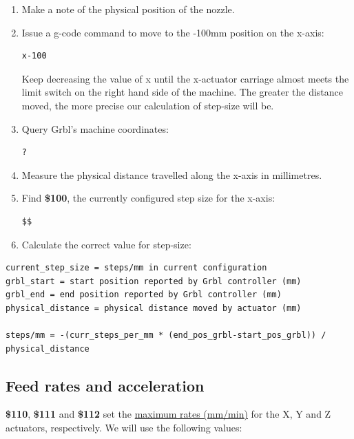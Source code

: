 \documentclass[]{book}
\theoremstyle{definition}
\theoremstyle{definition}
\theoremstyle{remark}
\begin{document}
\begin{enumerate}
\def\labelenumi{\arabic{enumi}.}
\setcounter{enumi}{2}
\item
  Make a note of the physical position of the nozzle.
\item
  Issue a g-code command to move to the -100mm position on the x-axis:

\begin{verbatim}
x-100
\end{verbatim}

  Keep decreasing the value of x until the x-actuator carriage almost
  meets the limit switch on the right hand side of the machine. The
  greater the distance moved, the more precise our calculation of
  step-size will be.
\item
  Query Grbl's machine coordinates:

\begin{verbatim}
?
\end{verbatim}
\item
  Measure the physical distance travelled along the x-axis in
  millimetres.
\item
  Find \textbf{\$100}, the currently configured step size for the
  x-axis:

\begin{verbatim}
$$
\end{verbatim}
\item
  Calculate the correct value for step-size:
\end{enumerate}

\begin{verbatim}
current_step_size = steps/mm in current configuration
grbl_start = start position reported by Grbl controller (mm)
grbl_end = end position reported by Grbl controller (mm)
physical_distance = physical distance moved by actuator (mm)

steps/mm = -(curr_steps_per_mm * (end_pos_grbl-start_pos_grbl)) / physical_distance
\end{verbatim}

\subsection{Feed rates and
acceleration}\label{feed-rates-and-acceleration}

\textbf{\$110}, \textbf{\$111} and \textbf{\$112} set the
\href{https://github.com/gnea/grbl/wiki/Grbl-v1.1-Configuration\#110-111-and-112--xyz-max-rate-mmmin}{maximum
rates (mm/min)} for the X, Y and Z actuators, respectively. We will use
the following values:
\end{document}
